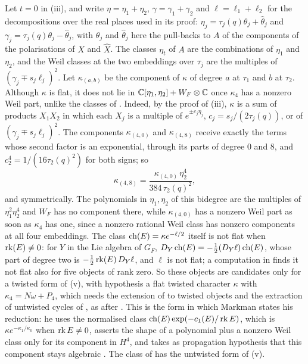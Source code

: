 \begin{remark}\label{rem:quarticsecantshape}
Let $t=0$ in (iii), and write
$\eta=\eta_{1}+\eta_{2}$, $\gamma=\gamma_{1}+\gamma_{2}$ and
$\ell=\ell_{1}+\ell_{2}$ for the decompositions over the real places used in
its proof: $\eta_{j}=\tau_{j}(q)\theta_{j}+\widehat\theta_{j}$ and
$\gamma_{j}=\tau_{j}(q)\theta_{j}-\widehat\theta_{j}$, with $\theta_{j}$ and
$\widehat\theta_{j}$ here the pull-backs to $A$ of the components of the
polarisations of $X$ and $\widehat X$. The classes $\eta_{t}$ of $A$ are the
combinations of $\eta_{1}$ and $\eta_{2}$, and the Weil classes at the two
embeddings over $\tau_{j}$ are the multiples of
$(\gamma_{j}\mp s_{j}\ell_{j})^{2}$. Let $\kappa_{(a,b)}$ be the component of
$\kappa$ of degree $a$ at $\tau_{1}$ and $b$ at $\tau_{2}$. Although $\kappa$
is flat, it does not lie in $\mathbb{C}[\eta_{1},\eta_{2}]+W_{F}\otimes\mathbb{C}$ once
$\kappa_{4}$ has a nonzero Weil part, unlike the classes of
. Indeed, by the proof of (iii),
$\kappa$ is a sum of products $X_{1}X_{2}$ in which each $X_{j}$ is a multiple
of $e^{\pm c_{j}\eta_{j}}$, $c_{j}=s_{j}/(2\tau_{j}(q))$, or of
$(\gamma_{j}\mp s_{j}\ell_{j})^{2}$. The components $\kappa_{(4,0)}$ and
$\kappa_{(4,8)}$ receive exactly the terms whose second factor is an
exponential, through its parts of degree $0$ and $8$, and
$c_{2}^{4}=1/(16\tau_{2}(q)^{2})$ for both signs; so
\[
  \kappa_{(4,8)}=\frac{\kappa_{(4,0)}\,\eta_{2}^{4}}{384\,\tau_{2}(q)^{2}},
\]
and symmetrically. The polynomials in $\eta_{1},\eta_{2}$ of this bidegree
are the multiples of $\eta_{1}^{2}\eta_{2}^{4}$ and $W_{F}$ has no component
there, while $\kappa_{(4,0)}$ has a nonzero Weil part as soon as $\kappa_{4}$
has one, since a nonzero rational Weil class has nonzero components at all
four embeddings. The class $\operatorname{ch}(E)=\kappa e^{-\ell/2}$ itself is not flat
when $\operatorname{rk}(E)\ne0$: for $Y$ in the Lie algebra of $G_{F}$,
$D_{Y}\operatorname{ch}(E)=-\tfrac12(D_{Y}\ell)\operatorname{ch}(E)$, whose part of degree two is
$-\tfrac12\operatorname{rk}(E)\,D_{Y}\ell$, and $\ell$ is not flat; a computation in
\cite{BMB26} finds it not flat also for five objects of rank zero. So these objects are
candidates only for a twisted form of (v), with
hypothesis a flat twisted character $\kappa$ with $\kappa_{4}=N\omega+P_{4}$,
which needs the extension of  to twisted objects \cite{Per26}
and the extraction of untwisted cycles of \cite[Section~2]{Mar25b}, as after
. This is the form in which Markman states his
reduction: he uses the normalised class $\operatorname{ch}(E)\exp(-c_{1}(E)/\operatorname{rk} E)$, which is
$\kappa e^{-\kappa_{1}/\kappa_{0}}$ when $\operatorname{rk} E\ne0$, asserts the shape of a
polynomial plus a nonzero Weil class only for its component in $H^{4}$, and
takes as propagation hypothesis that this component stays algebraic
\cite[Proposition~10.2.1, Corollary~10.2.3]{Mar25c}. The class of
 has the untwisted form of
(v).
\end{remark}

